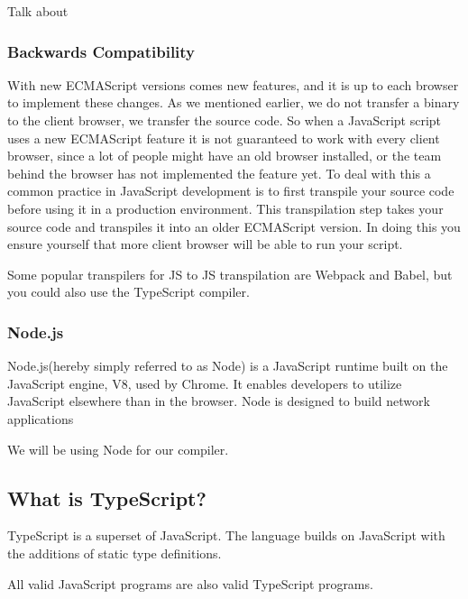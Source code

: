 Talk about

\subsubsection{Backwards Compatibility}

With new ECMAScript versions comes new features, and it is up to each browser to implement these changes.
As we mentioned earlier, we do not transfer a binary to the client browser, we transfer the source code.
So when a JavaScript script uses a new ECMAScript feature it is not guaranteed to work with every client browser, since a lot of people might have an old browser installed, or the team behind the browser has not implemented the feature yet.
To deal with this a common practice in JavaScript development is to first transpile your source code before using it in a production environment.
This transpilation step takes your source code and transpiles it into an older ECMAScript version.
In doing this you ensure yourself that more client browser will be able to run your script.

Some popular transpilers for JS to JS transpilation are Webpack and Babel, but you could also use the TypeScript compiler.

\subsubsection{Node.js}

Node.js(hereby simply referred to as Node) is a JavaScript runtime built on the JavaScript engine, V8, used by Chrome.
It enables developers to utilize JavaScript elsewhere than in the browser.
Node is designed to build network applications

We will be using Node for our compiler.

\subsection{What is TypeScript?}\label{subsec:what-is-typescript}

TypeScript is a superset of JavaScript.
The language builds on JavaScript with the additions of static type definitions\cite{tswebsite}.

All valid JavaScript programs are also valid TypeScript programs.
